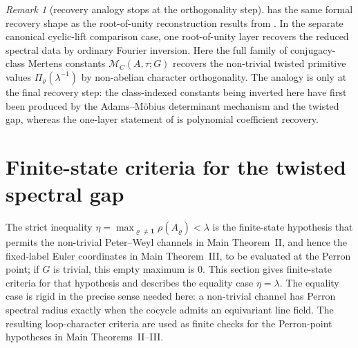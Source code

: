 \documentclass[11pt,a4paper]{amsart}
\theoremstyle{plain}
\theoremstyle{definition}
\theoremstyle{remark}
\newtheorem{remark}[theorem]{Remark}
\begin{document}
\begin{remark}[recovery analogy stops at the orthogonality step]
  \label{rem:recovery-analogy-orthogonality-step}
  \label{rem:readout-analogy-orthogonality-step}
   has the same formal recovery shape as
  the root-of-unity reconstruction results from .
  In the separate canonical cyclic-lift comparison case, one
  root-of-unity layer recovers the reduced spectral data by ordinary
  Fourier inversion.
  Here the full family of
  conjugacy-class Mertens constants \(\mathcal M_C(A,\tau;G)\) recovers
  the non-trivial twisted
  primitive values \(\Pi_\varrho(\lambda^{-1})\) by non-abelian
  character orthogonality. The analogy is only at the final recovery
  step: the class-indexed constants being inverted here have first been
  produced by the
  Adams--M\"obius determinant mechanism and the twisted gap, whereas
  the one-layer statement of  is polynomial
  coefficient recovery.
\end{remark}
\section{Finite-state criteria for the twisted spectral gap}
\label{sec:eta-gap}

The strict inequality
\(\eta=\max_{\varrho\neq\mathbf 1}\rho(A_\varrho)<\lambda\) is the
finite-state hypothesis that permits the non-trivial Peter--Weyl channels in
Main Theorem~II, and hence the fixed-label Euler coordinates in Main
Theorem~III, to be evaluated at the Perron point; if \(G\) is trivial, this
empty maximum is \(0\).  This section gives finite-state criteria for that hypothesis and describes the equality case
\(\eta=\lambda\).  The equality case is rigid in the precise sense needed
here: a non-trivial channel has Perron spectral radius exactly when the
cocycle admits an equivariant line field.  The resulting loop-character
criteria are used as finite checks for the Perron-point hypotheses in Main
Theorems~II--III.
\end{document}
